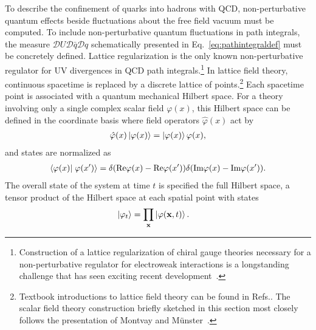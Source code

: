 To describe the confinement of quarks into hadrons with QCD, non-perturbative quantum effects beside fluctuations about the free field vacuum must be computed. 
To include non-perturbative quantum fluctuations in path integrals, the measure $\mathcal{D}U\mathcal{D}\bar{q}\mathcal{D}q$ schematically presented in Eq.~\eqref{eq:pathintegraldef} must be concretely defined. 
Lattice regularization is the only known non-perturbative regulator for UV divergences in QCD path integrals.\footnote{Construction of a lattice regularization of chiral gauge theories necessary for a non-perturbative regulator for electroweak interactions is a longstanding challenge that has seen exciting recent development~\cite{Grabowska:2015qpk,Grabowska:2016bis}.}
In lattice field theory, continuous spacetime is replaced by a discrete lattice of points.\footnote{Textbook introductions to lattice field theory can be found in Refs.\cite{creutz:1983quarks,Gupta:1997nd,smit:2002introduction,montvay:1997quantum}. The scalar field theory construction briefly sketched in this section most closely follows the presentation of Montvay and M{\"u}nster~\cite{montvay:1997quantum}.} 
Each spacetime point is associated with a quantum mechanical Hilbert space.
For a theory involving only a single complex scalar field $\varphi(x)$, this Hilbert space can be defined in the coordinate basis where field operators $\hat{\varphi}(x)$ act by
\begin{equation}
  \begin{split}
    \hat{\varphi}(x)\left| \varphi(x) \right> = \left| \varphi(x) \right>\varphi(x),
  \end{split}\label{eq:scalarstatedef}
\end{equation}
and states are normalized as
\begin{equation}
  \begin{split}
    \braket{\varphi(x)}{\varphi(x^\prime)} = \delta(\text{Re}\varphi(x) - \text{Re}\varphi(x^\prime))\delta(\text{Im}\varphi(x) - \text{Im}\varphi(x^\prime)).
  \end{split}\label{eq:scalarnormdef}
\end{equation}
The overall state of the system at time $t$ is specified the full Hilbert space, a tensor product of the Hilbert space at each spatial point with states 
\begin{equation}
  \begin{split}
    \left| \varphi_t \right> &= \prod_{\mathbf{x}}\left| \varphi(\mathbf{x},t) \right>. 
  \end{split}\label{eq:scalarproduct}
\end{equation}
